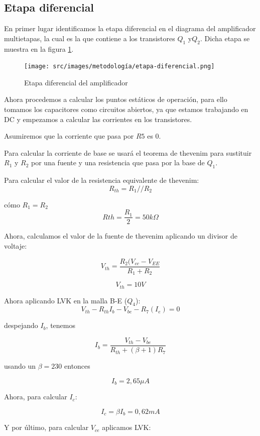 \subsection{Etapa diferencial} 

En primer lugar identificamos la etapa diferencial en el diagrama del amplificador multietapas, la cual es la que contiene a los transistores $Q_1$ y$Q_2$. Dicha etapa se muestra en la figura \ref{fig:met-etapa-amplificador-de-diferencial}.

\begin{figure}[ht]
    \centering
    \texttt{[image: src/images/metodología/etapa-diferencial.png]}
    \caption{Etapa diferencial del amplificador}
    \label{fig:met-etapa-amplificador-de-diferencial}
\end{figure}

Ahora procedemos a calcular los puntos estáticos de operación, para ello tomamos los capacitores como circuitos abiertos, ya que estamos trabajando en DC y empezamos a calcular las corrientes en los transistores.

Asumiremos que la corriente que pasa por $R5$ es 0.

Para calcular la corriente de base se usará el teorema de thevenim para sustituir $R_1$ y $R_2$ por una fuente y una resistencia que pasa por la base de $Q_1$.

Para calcular el valor de la resistencia equivalente de thevenim:
$$R_{th} = R_1 // R_2$$

cómo $R_1 = R_2$
$$Rth = \frac{R_1}{2} = 50k \Omega$$

Ahora, calculamos el valor de la fuente de thevenim aplicando un divisor de voltaje:

$$V_{th} = \frac{R_2 ( V_{cc} - V_{EE}}{R_1 + R_2}$$

$$V_{th} = 10 V$$

Ahora aplicando LVK en la malla B-E ($Q_4$):
\begin{equation*}
V_{th} - R_{th}I_b - V_{be} - R_7(I_e) = 0
\end{equation*}

despejando $I_b$, tenemos

$$I_b = \frac{V_{th} - V_{be}}{R_{th} + (\beta + 1) R_7}$$

usando un $\beta = 230$ entonces

$$I_{b} = 2,65\mu A$$

Ahora, para calcular $I_c$:

$$I_{c} = \beta I_b = 0,62mA$$

Y por último, para calcular $V_{ce}$ aplicamos LVK:

